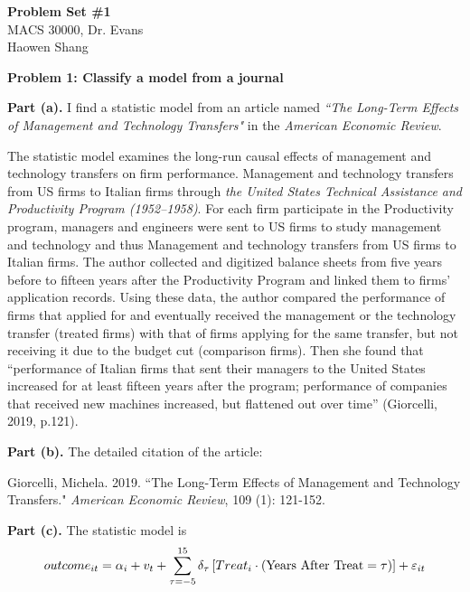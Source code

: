 \documentclass[letterpaper,12pt]{article}
\theoremstyle{definition}
\begin{document}
\begin{flushleft}
  \textbf{\large{Problem Set \#1}} \\
  MACS 30000, Dr. Evans \\
  Haowen Shang
\end{flushleft}

\vspace{5mm}

\noindent\textbf{Problem 1: Classify a model from a journal}

\textbf{Part (a).} I find a statistic model from an article named \emph{``The Long-Term Effects of Management and Technology Transfers"} in the \emph{American Economic Review}.

The statistic model examines the long-run causal effects of management and technology transfers on firm performance. Management and technology transfers from US firms to Italian firms through  \emph{the United States Technical Assistance and Productivity Program (1952–1958)}.  For each firm participate in the Productivity program, managers and engineers were sent to US firms to study management and technology and thus Management and technology transfers from US firms to Italian firms. The author collected and digitized balance sheets from five years before to fifteen years after the Productivity Program and linked them to firms’ application records. Using these data, the author compared the performance of firms that applied for and eventually received the management or the technology transfer (treated firms) with that of firms applying for the same transfer, but not receiving it due to the budget cut (comparison firms). Then she found that ``performance of Italian firms that sent their managers to the United States increased for at least fifteen years after the program; performance of companies that received new machines increased, but flattened out over time'' (Giorcelli, 2019, p.121).

\textbf{Part (b).} The detailed citation of the article:

Giorcelli, Michela. 2019. ``The Long-Term Effects of Management and Technology Transfers." \emph{American Economic Review}, 109 (1): 121-152.

\textbf{Part (c).} The statistic model is 
\begin{equation*}
 outcome_{it} = \alpha_{i} + v_{t} + \sum_{\tau =-5}^{15} \delta_{\tau }\left [ Treat_{i} \cdot \left ( \textup{Years After Treat} = \tau  \right ) \right ] + \varepsilon_{it}
\end{equation*}
\end{document}
